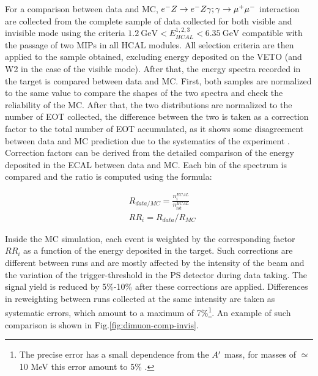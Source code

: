 For a comparison between data and MC, $e^- Z \to e^- Z \gamma; \gamma \to \mu^+ \mu^-$ interaction are collected from the complete sample of data collected for both visible and invisible mode using the criteria $\SI{1.2}{\giga\electronvolt} < E_{HCAL}^{1,2,3} < \SI{6.35}{\giga\electronvolt}$ compatible with the passage of two MIPs in all HCAL modules. All selection criteria are then applied to the sample obtained, excluding energy deposited on the VETO (and W2 in the case of the visible mode). After that, the energy spectra recorded in the target is compared between data and MC. First, both samples are normalized to the same value to compare the shapes of the two spectra and check the reliability of the MC. After that, the two distributions are normalized to the number of EOT collected, the difference between the two is taken as a correction factor to the total number of EOT accumulated, as it shows some disagreement between data and MC prediction due to the systematics of the experiment \cite{na64-prd}. Correction factors can be derived from the detailed comparison of the energy deposited in the ECAL between data and MC. Each bin of the spectrum is compared and the ratio is computed using the formula:

\begin{equation}  
  \label{eq:RR-factor}
  \begin{aligned}
  &R_{data/MC} = \frac{n_i^{ECAL}}{n_{tot}^{ECAL}} \\
  &RR_i = R_{data}/R_{MC}
  \end{aligned}
\end{equation}

Inside the MC simulation, each event is weighted by the corresponding factor $RR_i$ as a function of the energy deposited in the target. Such corrections are different between runs and are mostly affected by the intensity of the beam and the variation of the trigger-threshold in the PS detector during data taking. The signal yield is reduced by 5\%-10\% after these corrections are applied. Differences in reweighting between runs collected at the same intensity are taken as systematic errors, which amount to a maximum of 7\%\footnote{The precise error has a small dependence from the $A'$ mass, for masses of $\simeq$10 MeV this error amount to 5\% \cite{na64-prd}.}. An example of such comparison is shown in Fig.\ref{fig:dimuon-comp-invis}.

